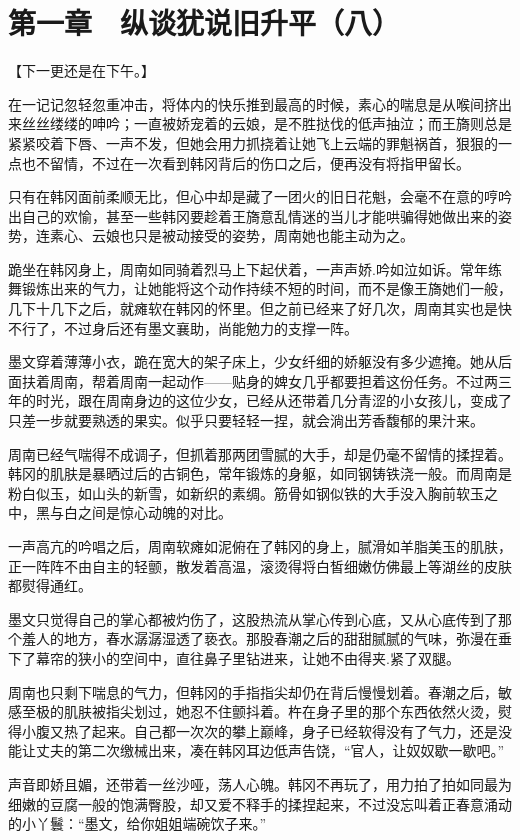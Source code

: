 \section{第一章　纵谈犹说旧升平（八）}

【下一更还是在下午。】

在一记记忽轻忽重冲击，将体内的快乐推到最高的时候，素心的喘息是从喉间挤出来丝丝缕缕的呻吟；一直被娇宠着的云娘，是不胜挞伐的低声抽泣；而王旖则总是紧紧咬着下唇、一声不发，但她会用力抓挠着让她飞上云端的罪魁祸首，狠狠的一点也不留情，不过在一次看到韩冈背后的伤口之后，便再没有将指甲留长。

只有在韩冈面前柔顺无比，但心中却是藏了一团火的旧日花魁，会毫不在意的哼吟出自己的欢愉，甚至一些韩冈要趁着王旖意乱情迷的当儿才能哄骗得她做出来的姿势，连素心、云娘也只是被动接受的姿势，周南她也能主动为之。

跪坐在韩冈身上，周南如同骑着烈马上下起伏着，一声声娇.吟如泣如诉。常年练舞锻炼出来的气力，让她能将这个动作持续不短的时间，而不是像王旖她们一般，几下十几下之后，就瘫软在韩冈的怀里。但之前已经来了好几次，周南其实也是快不行了，不过身后还有墨文襄助，尚能勉力的支撑一阵。

墨文穿着薄薄小衣，跪在宽大的架子床上，少女纤细的娇躯没有多少遮掩。她从后面扶着周南，帮着周南一起动作——贴身的婢女几乎都要担着这份任务。不过两三年的时光，跟在周南身边的这位少女，已经从还带着几分青涩的小女孩儿，变成了只差一步就要熟透的果实。似乎只要轻轻一捏，就会淌出芳香馥郁的果汁来。

周南已经气喘得不成调子，但抓着那两团雪腻的大手，却是仍毫不留情的揉捏着。韩冈的肌肤是暴晒过后的古铜色，常年锻炼的身躯，如同钢铸铁浇一般。而周南是粉白似玉，如山头的新雪，如新织的素绸。筋骨如钢似铁的大手没入胸前软玉之中，黑与白之间是惊心动魄的对比。

一声高亢的吟唱之后，周南软瘫如泥俯在了韩冈的身上，腻滑如羊脂美玉的肌肤，正一阵阵不由自主的轻颤，散发着高温，滚烫得将白皙细嫩仿佛最上等湖丝的皮肤都熨得通红。

墨文只觉得自己的掌心都被灼伤了，这股热流从掌心传到心底，又从心底传到了那个羞人的地方，春水潺潺湿透了亵衣。那股春潮之后的甜甜腻腻的气味，弥漫在垂下了幕帘的狭小的空间中，直往鼻子里钻进来，让她不由得夹.紧了双腿。

周南也只剩下喘息的气力，但韩冈的手指指尖却仍在背后慢慢划着。春潮之后，敏感至极的肌肤被指尖划过，她忍不住颤抖着。杵在身子里的那个东西依然火烫，熨得小腹又热了起来。自己都一次次的攀上巅峰，身子已经软得没有了气力，还是没能让丈夫的第二次缴械出来，凑在韩冈耳边低声告饶，“官人，让奴奴歇一歇吧。”

声音即娇且媚，还带着一丝沙哑，荡人心魄。韩冈不再玩了，用力拍了拍如同最为细嫩的豆腐一般的饱满臀股，却又爱不释手的揉捏起来，不过没忘叫着正春意涌动的小丫鬟：“墨文，给你姐姐端碗饮子来。”

